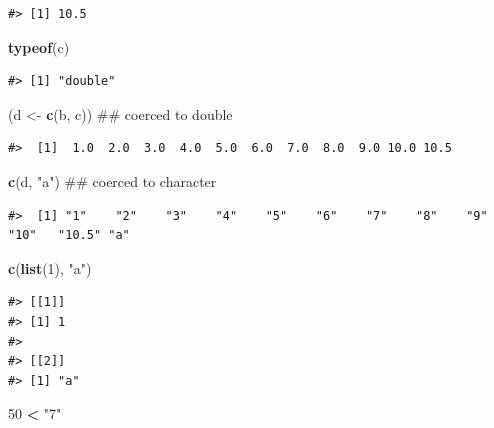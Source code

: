 \documentclass[]{book}
\newenvironment{Shaded}{\begin{snugshade}}{\end{snugshade}}
\newcommand{\KeywordTok}[1]{\textcolor[rgb]{0.13,0.29,0.53}{\textbf{#1}}}
\newcommand{\DecValTok}[1]{\textcolor[rgb]{0.00,0.00,0.81}{#1}}
\newcommand{\StringTok}[1]{\textcolor[rgb]{0.31,0.60,0.02}{#1}}
\newcommand{\OperatorTok}[1]{\textcolor[rgb]{0.81,0.36,0.00}{\textbf{#1}}}
\newcommand{\NormalTok}[1]{#1}
\theoremstyle{definition}
\theoremstyle{definition}
\theoremstyle{definition}
\theoremstyle{remark}
\begin{document}
\begin{verbatim}
#> [1] 10.5
\end{verbatim}

\begin{Shaded}
\begin{Highlighting}[]
\KeywordTok{typeof}\NormalTok{(c)}
\end{Highlighting}
\end{Shaded}

\begin{verbatim}
#> [1] "double"
\end{verbatim}

\begin{Shaded}
\begin{Highlighting}[]
\NormalTok{(d <-}\StringTok{ }\KeywordTok{c}\NormalTok{(b, c))  ## coerced to double}
\end{Highlighting}
\end{Shaded}

\begin{verbatim}
#>  [1]  1.0  2.0  3.0  4.0  5.0  6.0  7.0  8.0  9.0 10.0 10.5
\end{verbatim}

\begin{Shaded}
\begin{Highlighting}[]
\KeywordTok{c}\NormalTok{(d, }\StringTok{"a"}\NormalTok{)       ## coerced to character}
\end{Highlighting}
\end{Shaded}

\begin{verbatim}
#>  [1] "1"    "2"    "3"    "4"    "5"    "6"    "7"    "8"    "9"    "10"   "10.5" "a"
\end{verbatim}

\begin{Shaded}
\begin{Highlighting}[]
\KeywordTok{c}\NormalTok{(}\KeywordTok{list}\NormalTok{(}\DecValTok{1}\NormalTok{), }\StringTok{"a"}\NormalTok{)}
\end{Highlighting}
\end{Shaded}

\begin{verbatim}
#> [[1]]
#> [1] 1
#> 
#> [[2]]
#> [1] "a"
\end{verbatim}

\begin{Shaded}
\begin{Highlighting}[]
\DecValTok{50} \OperatorTok{<}\StringTok{ "7"}
\end{Highlighting}
\end{Shaded}
\end{document}
